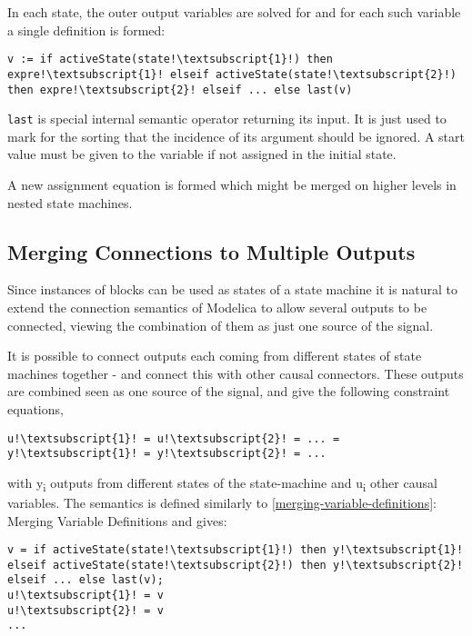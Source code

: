 In each state, the outer output variables are solved for and for each
such variable a single definition is formed:
\begin{lstlisting}[language=modelica,escapechar=!]
v := if activeState(state!\textsubscript{1}!) then expre!\textsubscript{1}! elseif activeState(state!\textsubscript{2}!) then expre!\textsubscript{2}! elseif ... else last(v)
\end{lstlisting}

\lstinline!last! is special internal semantic operator returning its
input. It is just used to mark for the sorting that the incidence of its
argument should be ignored. A start value must be given to the variable
if not assigned in the initial state.

A new assignment equation is formed which might be merged on higher
levels in nested state machines.

\subsection{Merging Connections to Multiple Outputs}\label{merging-connections-to-multiple-outputs}

\begin{nonnormative}
Since instances of blocks can be used as states of a state
machine it is natural to extend the connection semantics of Modelica to
allow several outputs to be connected, viewing the combination of them as just one source of the signal.
\end{nonnormative}

It is possible to connect outputs each coming from different states of state machines together - and connect this with other causal connectors.
These outputs are combined seen as one source of the signal, and give the following constraint equations,
\begin{lstlisting}[language=modelica,escapechar=!]
u!\textsubscript{1}! = u!\textsubscript{2}! = ... = y!\textsubscript{1}! = y!\textsubscript{2}! = ...
\end{lstlisting}
with y\textsubscript{i} outputs from different states of the state-machine and u\textsubscript{i} other causal variables. The
semantics is defined similarly to \cref{merging-variable-definitions}:
Merging Variable Definitions and gives:
\begin{lstlisting}[language=modelica,escapechar=!]
v = if activeState(state!\textsubscript{1}!) then y!\textsubscript{1}! elseif activeState(state!\textsubscript{2}!) then y!\textsubscript{2}! elseif ... else last(v);
u!\textsubscript{1}! = v
u!\textsubscript{2}! = v
...
\end{lstlisting}

